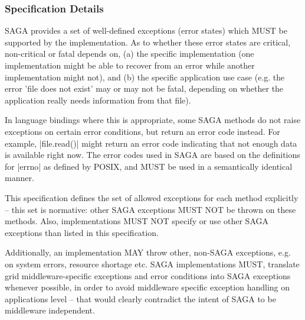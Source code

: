  \subsubsection{Specification Details}
 
  SAGA provides a set of well-defined exceptions (error states)
  which MUST be supported by the implementation.  As to whether
  these error states are critical, non-critical or fatal depends
  on, (a) the specific implementation (one implementation might
  be able to recover from an error while another implementation
  might not), and (b) the specific application use case (e.g.
  the error 'file does not exist' may or may not be fatal,
  depending on whether the application really needs information
  from that file).
  
  In language bindings where this is appropriate, some SAGA
  methods do not raise exceptions on certain error conditions,
  but return an error code instead.  For example, |file.read()|
  might return an error code indicating that  not enough data is
  available right now.  The error codes used in SAGA are based
  on the definitions for |errno| as defined by POSIX, and MUST
  be used in a semantically identical manner.
  

  This specification defines the set of allowed exceptions for
  each method explicitly -- this set is normative: other SAGA
  exceptions MUST NOT be thrown on these methods. Also,
  implementations MUST NOT specify or use other SAGA exceptions
  than listed in this specification.
 
  Additionally, an implementation MAY throw other, non-SAGA
  exceptions, e.g. on system errors, resource shortage etc.
  SAGA implementations MUST, translate grid
  middleware-specific exceptions and error conditions into SAGA
  exceptions whenever possible, in order to avoid middleware
  specific exception handling on applications level -- that
  would clearly contradict the intent of SAGA to be middleware
  independent.
  
